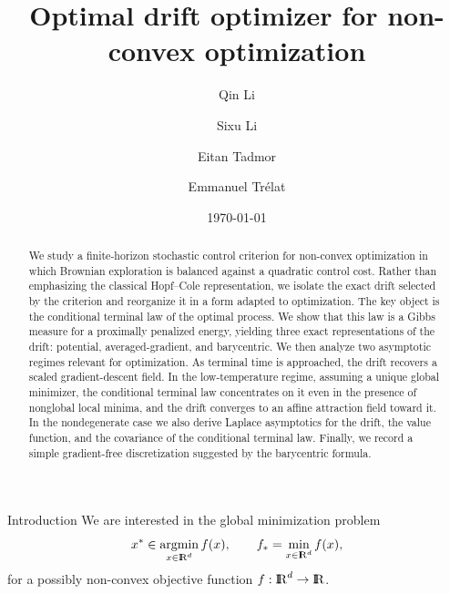 \documentclass[11pt]{amsart}
\title[Optimal drift optimizer for non-convex optimization]{Optimal drift optimizer for non-convex optimization}
\author{Qin Li}
\author{Sixu Li}
\author{Eitan Tadmor}
\author{Emmanuel Tr\'{e}lat}
\date{\today}
\makeatletter
\renewcommand{\section}{\@startsection{section}{1}%
 \z@{.7\linespacing\@plus\linespacing}{.5\linespacing}%
 {\normalfont\large\bfseries\centering}} %
\def\R{\mathrm{I\kern-0.21emR}}
\numberwithin{equation}{section}
\numberwithin{figure}{section}
\theoremstyle{definition}\newtheorem{remark}[theorem]{Remark}%
\makeatother
\begin{document}
\begin{abstract}
We study a finite-horizon stochastic control criterion for non-convex optimization in which Brownian exploration is balanced against a quadratic control cost. Rather than emphasizing the classical Hopf--Cole representation, we isolate the exact drift selected by the criterion and reorganize it in a form adapted to optimization. The key object is the conditional terminal law of the optimal process. We show that this law is a Gibbs measure for a proximally penalized energy, yielding three exact representations of the drift: potential, averaged-gradient, and barycentric. We then analyze two asymptotic regimes relevant for optimization. As terminal time is approached, the drift recovers a scaled gradient-descent field. In the low-temperature regime, assuming a unique global minimizer, the conditional terminal law concentrates on it even in the presence of nonglobal local minima, and the drift converges to an affine attraction field toward it. In the nondegenerate case we also derive Laplace asymptotics for the drift, the value function, and the covariance of the conditional terminal law. Finally, we record a simple gradient-free discretization suggested by the barycentric formula.
\end{abstract}
\maketitle

\setcounter{tocdepth}{1}
\tableofcontents

\section{Introduction}\label{intro_sec}
We are interested in the global minimization problem
$$
x^* \in \operatorname*{argmin}_{x \in \R^d} f(x),
\qquad
f_* = \min_{x \in \R^d} f(x),
$$
for a possibly non-convex objective function $f : \R^d \to \R$.
\end{document}
